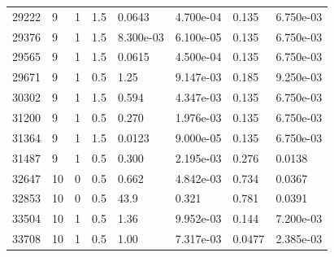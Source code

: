 \documentclass[preview]{standalone}
\begin{document}
{{{\begin{tabular}{L{1.2cm}C{1.2cm} C{0.3cm}C{0.5cm} C{1.4cm}C{1.4cm} C{1.4cm}C{1.4cm}}
  29222  &     9  & 1     & 1.5 &  0.0643  & 4.700e-04  & 0.135 &  6.750e-03   \\ 
  29376  &     9  & 1     & 1.5 &  8.300e-03  & 6.100e-05  & 0.135 &  6.750e-03   \\ 
  29565  &     9  & 1     & 1.5 &  0.0615  & 4.500e-04  & 0.135 &  6.750e-03   \\ 
  29671  &     9  & 1     & 0.5 &  1.25  & 9.147e-03  & 0.185 &  9.250e-03   \\ 
  30302  &     9  & 1     & 1.5 &  0.594  & 4.347e-03  & 0.135 &  6.750e-03   \\ 
  31200  &     9  & 1     & 0.5 &  0.270  & 1.976e-03  & 0.135 &  6.750e-03   \\ 
  31364  &     9  & 1     & 1.5 &  0.0123  & 9.000e-05  & 0.135 &  6.750e-03   \\ 
  31487  &     9  & 1     & 0.5 &  0.300  & 2.195e-03  & 0.276 &  0.0138   \\ 
  32647  &    10  & 0     & 0.5 &  0.662  & 4.842e-03  & 0.734 &  0.0367   \\ 
  32853  &    10  & 0     & 0.5 &  43.9  & 0.321  & 0.781 &  0.0391   \\ 
  33504  &    10  & 1     & 0.5 &  1.36  & 9.952e-03  & 0.144 &  7.200e-03   \\ 
  33708  &    10  & 1     & 0.5 &  1.00  & 7.317e-03  & 0.0477 &  2.385e-03   \\ 
\hline 
\end{tabular} 

}}}
\end{document}
